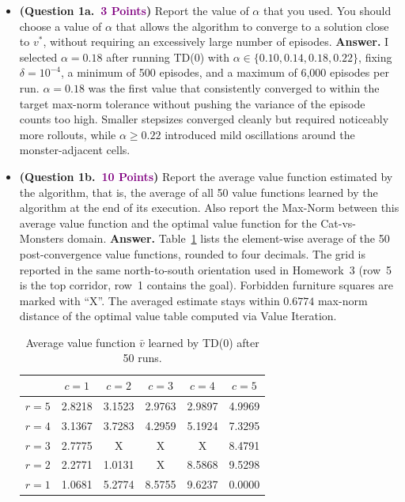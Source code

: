\documentclass{article}
\newcommand{\POINTS}[1]{\textcolor{purple}{\textbf{{#1}}}}
\begin{document}
\newpage
\begin{itemize}


        \item \textbf{(Question 1a.~\POINTS{3 Points})} Report the value of $\alpha$ that you used. You should choose a value of $\alpha$ that allows the algorithm to converge to a solution close to $v^{*}$, without requiring an excessively large number of episodes.
        \vspace{0.2cm}
        \textbf{Answer.} I selected $\alpha = 0.18$ after running TD(0) with $\alpha \in \{0.10, 0.14, 0.18, 0.22\}$, fixing $\delta = 10^{-4}$, a minimum of 500 episodes, and a maximum of 6{,}000 episodes per run. $\alpha = 0.18$ was the first value that consistently converged to within the target max-norm tolerance without pushing the variance of the episode counts too high. Smaller stepsizes converged cleanly but required noticeably more rollouts, while $\alpha \geq 0.22$ introduced mild oscillations around the monster-adjacent cells.



        \item \textbf{(Question 1b.~\POINTS{10 Points})} Report the average value function estimated by the algorithm, that is, the average of all 50 value functions learned by the algorithm at the end of its execution. Also report the Max-Norm between this average value function and the optimal value function for the Cat-vs-Monsters domain.
        \vspace{0.2cm}
        \textbf{Answer.} Table~\ref{tab:td_value} lists the element-wise average of the 50 post-convergence value functions, rounded to four decimals. The grid is reported in the same north-to-south orientation used in Homework~3 (row~5 is the top corridor, row~1 contains the goal). Forbidden furniture squares are marked with ``X''. The averaged estimate stays within $0.6774$ max-norm distance of the optimal value table computed via Value Iteration.

        \begin{table}[h]
            \centering
            \caption{Average value function $\bar v$ learned by TD(0) after 50 runs.}
            \label{tab:td_value}
            \begin{tabular}{c|ccccc}
                & $c=1$ & $c=2$ & $c=3$ & $c=4$ & $c=5$\\
                \hline
                $r=5$ & 2.8218 & 3.1523 & 2.9763 & 2.9897 & 4.9969\\
                $r=4$ & 3.1367 & 3.7283 & 4.2959 & 5.1924 & 7.3295\\
                $r=3$ & 2.7775 & X & X & X & 8.4791\\
                $r=2$ & 2.2771 & 1.0131 & X & 8.5868 & 9.5298\\
                $r=1$ & 1.0681 & 5.2774 & 8.5755 & 9.6237 & 0.0000\\
            \end{tabular}
        \end{table}




\end{itemize}
\end{document}
